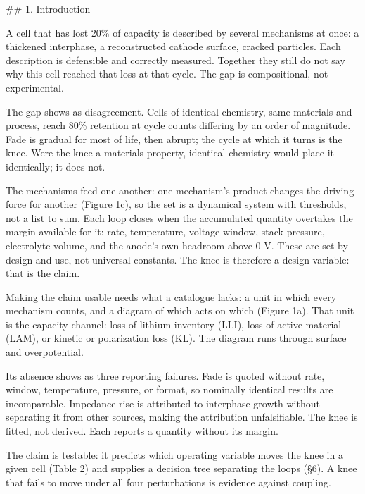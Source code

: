 ## 1. Introduction

A cell that has lost 20\% of capacity is described by several mechanisms at once: a thickened interphase,\cite{adenusi2023lithium} a reconstructed cathode surface,\cite{tornheim2019effect} cracked particles.\cite{wheatcroft2023fracture} Each description is defensible and correctly measured. Together they still do not say why this cell reached that loss at that cycle. The gap is compositional, not experimental.

The gap shows as disagreement. Cells of identical chemistry, same materials and process, reach 80\% retention at cycle counts differing by an order of magnitude. Fade is gradual for most of life, then abrupt; the cycle at which it turns is the knee. Were the knee a materials property, identical chemistry would place it identically; it does not.

The mechanisms feed one another: one mechanism's product changes the driving force for another (Figure 1c), so the set is a dynamical system with thresholds, not a list to sum. Each loop closes when the accumulated quantity overtakes the margin available for it: rate, temperature, voltage window, stack pressure, electrolyte volume, and the anode's own headroom above 0 V. These are set by design and use, not universal constants. The knee is therefore a design variable: that is the claim.

Making the claim usable needs what a catalogue lacks: a unit in which every mechanism counts, and a diagram of which acts on which (Figure 1a). That unit is the capacity channel: loss of lithium inventory (LLI), loss of active material (LAM), or kinetic or polarization loss (KL).\cite{birkl2017degradation,mndezcorbacho2024dest} The diagram runs through surface and overpotential.

Its absence shows as three reporting failures. Fade is quoted without rate, window, temperature, pressure, or format, so nominally identical results are incomparable.\cite{pastorfernndez2019critical} Impedance rise is attributed to interphase growth without separating it from other sources, making the attribution unfalsifiable.\cite{edge2021lithium} The knee is fitted, not derived.\cite{diao2019algorithm} Each reports a quantity without its margin.

The claim is testable: it predicts which operating variable moves the knee in a given cell (Table 2) and supplies a decision tree separating the loops (\S6). A knee that fails to move under all four perturbations is evidence against coupling.

